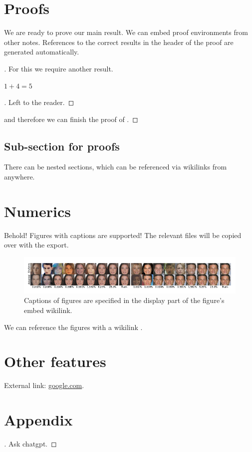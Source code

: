 \documentclass{article}
\begin{document}
\section{Proofs}
\label{loc:body.proofs}
We are ready to prove our main result. We can embed proof environments from other notes. References to the correct results in the header of the proof are generated automatically.
\begin{proof}[\hypertarget{loc:theorem_1.proof}Proof of \Cref{loc:theorem_1.statement}]

For this we require another result.
\begin{proposition}
\label{loc:lemma_2.statement}
$1+4 = 5$
\end{proposition}
\begin{proof}[\hypertarget{loc:lemma_2.proof}Proof of \Cref{loc:lemma_2.statement}]

Left to the reader.
\end{proof}
and therefore we can finish the proof of .
\end{proof}
\subsection{Sub-section for proofs}
\label{loc:body.proofs.sub:section_for_proofs}
There can be nested sections, which can be referenced via wikilinks from anywhere.
\section{Numerics}
\label{loc:body.numerics}
Behold! Figures with captions are supported! The relevant files will be copied over with the export.
\begin{figure}[h]
\centering
\includegraphics[width=\textwidth]{Files/intro_comp_wlabel.pdf}
\caption{Captions of figures are specified in the display part of the figure's embed wikilink.\label{fig:intro_comp_wlabel.pdf}}
\end{figure}
We can reference the figures with a wikilink .
\section{Other features}
\label{loc:body.other_features}
External link: \href{https://www.google.com}{google.com}.
\printbibliography
\appendix
\section{Appendix}
\begin{proof}[\hypertarget{loc:lemma_1.proof}Proof of \Cref{loc:lemma_1.statement}]

Ask chatgpt.
\end{proof}
\end{document}
